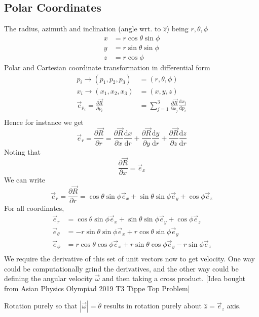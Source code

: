 \documentclass[10pts, letterpaper]{article}
\begin{document}
\subsection*{Polar Coordinates} 
The radius, azimuth and inclination (angle wrt. to $\hat{z}$) being $r, \theta, \phi$ 
\begin{align*}
	x &= r \cos \theta \sin \phi \\
	y &= r \sin \theta \sin \phi \\
	z &= r \cos \phi
\end{align*}
Polar and Cartesian coordinate transformation in differential form
\begin{align*}
	p_i \to (p_1,p_2, p_3 ) &= (r, \theta, \phi) \\
	x_i \to (x_1,x_2,x_3) &= (x,y,z) \\ 
	\vec{e}_{p_i} = 
	\frac{\partial \vec{R}}{\partial p_i} &= \sum_{j= 1}^{3}
\frac{\partial \vec{R}}{\partial x_j} \frac{\mathrm{d} x_j}{\mathrm{d} p_i}
	\\
\end{align*} Hence for instance we get 
\[
\vec{e}_r = \frac{\partial \vec{R}}{\partial r} = 
\frac{\partial \vec{R}}{\partial x} 
\frac{\mathrm{d} x}{\mathrm{d} r} + 
\frac{\partial \vec{R}}{\partial y} 
\frac{\mathrm{d} y}{\mathrm{d} r} + 
\frac{\partial \vec{R}}{\partial z} 
\frac{\mathrm{d} z}{\mathrm{d} r}
\]
Noting that 
\[
\frac{\partial \vec{R}}{\partial x} = \vec{e}_x 
\] 
We can write
\[
\vec{e}_r = \frac{\partial \vec{R}}{\partial r} = 
\cos \theta \sin \phi \vec{e}_x + 
\sin \theta \sin \phi \vec{e}_y + 
\cos \phi \vec{e}_z 
\]
For all coordinates, 
\begin{align*}
	\vec{e}_r &= 
\cos \theta \sin \phi \vec{e}_x + 
\sin \theta \sin \phi \vec{e}_y + 
\cos \phi \vec{e}_z 
\\ 
\vec{e}_\theta &= 
-r \sin \theta \sin \phi \vec{e}_x + 
r \cos \theta \sin \phi \vec{e}_y 
\\
\vec{e}_\phi &= 
r \cos \theta \cos \phi \vec{e}_x + 
r \sin \theta \cos \phi \vec{e}_y - 
r \sin \phi \vec{e}_z \\
\end{align*}
We require the derivative of this set of unit vectors now to get velocity. One way could be computationally grind the derivatives, and the other way could be defining the angular velocity $\vec{\omega}$ and then taking a cross product. [Idea bought from Asian Physics Olympiad 2019 T3 Tippe Top Problem] 

Rotation purely so that $| \vec{\omega} | = \dot{\theta}$ results in rotation purely about $\hat{z} = \vec{e}_z$ axis. 
\end{document}
